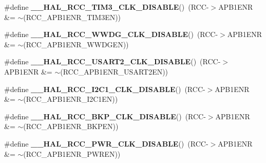 \begin{DoxyCompactItemize}
\#define {\bfseries \+\_\+\+\_\+\+H\+A\+L\+\_\+\+R\+C\+C\+\_\+\+T\+I\+M3\+\_\+\+C\+L\+K\+\_\+\+D\+I\+S\+A\+B\+LE}()~(R\+CC-\/$>$A\+P\+B1\+E\+NR \&= $\sim$(R\+C\+C\+\_\+\+A\+P\+B1\+E\+N\+R\+\_\+\+T\+I\+M3\+EN))
\item 
\mbox{\label{group___r_c_c___a_p_b1___clock___enable___disable_ga6afa0a633cf2553743a494d97aa5b997}} 
\#define {\bfseries \+\_\+\+\_\+\+H\+A\+L\+\_\+\+R\+C\+C\+\_\+\+W\+W\+D\+G\+\_\+\+C\+L\+K\+\_\+\+D\+I\+S\+A\+B\+LE}()~(R\+CC-\/$>$A\+P\+B1\+E\+NR \&= $\sim$(R\+C\+C\+\_\+\+A\+P\+B1\+E\+N\+R\+\_\+\+W\+W\+D\+G\+EN))
\item 
\mbox{\label{group___r_c_c___a_p_b1___clock___enable___disable_ga1edc6c83fbebf8b4265ef9500aa04b04}} 
\#define {\bfseries \+\_\+\+\_\+\+H\+A\+L\+\_\+\+R\+C\+C\+\_\+\+U\+S\+A\+R\+T2\+\_\+\+C\+L\+K\+\_\+\+D\+I\+S\+A\+B\+LE}()~(R\+CC-\/$>$A\+P\+B1\+E\+NR \&= $\sim$(R\+C\+C\+\_\+\+A\+P\+B1\+E\+N\+R\+\_\+\+U\+S\+A\+R\+T2\+EN))
\item 
\mbox{\label{group___r_c_c___a_p_b1___clock___enable___disable_ga490a853eae72da96aad5379a6e939dd8}} 
\#define {\bfseries \+\_\+\+\_\+\+H\+A\+L\+\_\+\+R\+C\+C\+\_\+\+I2\+C1\+\_\+\+C\+L\+K\+\_\+\+D\+I\+S\+A\+B\+LE}()~(R\+CC-\/$>$A\+P\+B1\+E\+NR \&= $\sim$(R\+C\+C\+\_\+\+A\+P\+B1\+E\+N\+R\+\_\+\+I2\+C1\+EN))
\item 
\mbox{\label{group___r_c_c___a_p_b1___clock___enable___disable_ga92487028f056da1dd56871832db91cf6}} 
\#define {\bfseries \+\_\+\+\_\+\+H\+A\+L\+\_\+\+R\+C\+C\+\_\+\+B\+K\+P\+\_\+\+C\+L\+K\+\_\+\+D\+I\+S\+A\+B\+LE}()~(R\+CC-\/$>$A\+P\+B1\+E\+NR \&= $\sim$(R\+C\+C\+\_\+\+A\+P\+B1\+E\+N\+R\+\_\+\+B\+K\+P\+EN))
\item 
\mbox{\label{group___r_c_c___a_p_b1___clock___enable___disable_gaf3db86d2db2bad45732a742b6a91ea0b}} 
\#define {\bfseries \+\_\+\+\_\+\+H\+A\+L\+\_\+\+R\+C\+C\+\_\+\+P\+W\+R\+\_\+\+C\+L\+K\+\_\+\+D\+I\+S\+A\+B\+LE}()~(R\+CC-\/$>$A\+P\+B1\+E\+NR \&= $\sim$(R\+C\+C\+\_\+\+A\+P\+B1\+E\+N\+R\+\_\+\+P\+W\+R\+EN))
\end{DoxyCompactItemize}


